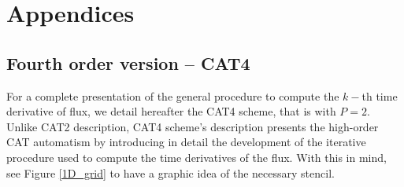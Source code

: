 \section{Appendices} \label{sec:appendix}
\subsection{Fourth order version -- CAT4}
\label{sec:CAT4}
For a complete presentation of the general procedure to compute the $k-$th time derivative of flux, we detail hereafter the CAT4 scheme, that is with $P=2$.
Unlike CAT2 description, CAT4 scheme's description presents the high-order CAT automatism by introducing in detail the development of the iterative procedure used to compute the time derivatives of the flux.
With this in mind, see Figure \ref{1D_grid} to have a graphic idea of the necessary stencil. 


